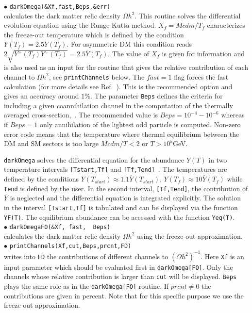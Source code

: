 \documentclass[12pt,a4paper]{article}
\begin{document}
\noindent 
$\bullet$ \verb|darkOmega(&Xf,fast,Beps,&err)|\\
calculates the dark matter relic density $\Omega h^2$. 
This routine  solves the differential evolution equation  using the Runge-Kutta method. 
$X_f=Mcdm/T_{f}$
characterizes the freeze-out temperature  which is defined by the
condition $Y(T_f)=2.5 \overline{Y}(T_f)$. For  asymmetric  DM this condition
reads $2\sqrt{Y^+(T_f)Y^-(T_f)}=2.5\overline{Y}(T_f)$.  The value of $X_f$ is given for
information and is also used as an input for the routine that
gives the relative contribution of each channel to $\Omega h^2$,
see \verb|printChannels|  below. The  $fast=1$ flag forces the
fast calculation (for more details see
Ref.~\cite{Belanger:2004yn}). This is the recommended option and
gives an accuracy around $1\%$. The parameter {\tt Beps} defines the
criteria for including a given coannihilation channel in the computation of the
thermally averaged cross-section,~\cite{Belanger:2004yn}.   The
recommended value is $Beps=10^{-4} - 10^{-6}$ whereas 
if $Beps=1$ only annihilation of the
lightest odd particle is computed. Non-zero error code means that the temperature where thermal equilibrium between the DM and SM sectors is too large  $Mcdm/T < 2$  or
$T>10^{5}$GeV. 

   
\verb|darkOmega| solves the differential equation for the abundance $Y(T)$   in  two  
temperature intervals {\tt [Tstart,Tf]}  and   {\tt [Tf,Tend]}~\cite{Belanger:2001fz}. The temperatures  are defined by the
conditions $Y(T_{start})\approx 1.1\overline{Y}(T_{start})$,
$Y(T_{f})\approx10\overline{Y}(T_{f})$ while  {\tt Tend} is defined by the
user. In the second interval,  {\tt [Tf,Tend]},  the contribution of  $\overline{Y}$
 is neglected and  the differential equation is integrated
explicitly. The solution in the interval {\tt [Tstart,Tf]}  is tabulated and can be displayed  via the
function {\tt YF(T)}. The equilibrium abundance can be accessed  with the function
{\tt Yeq(T)}. \\



\noindent
$\bullet$ \verb|darkOmegaFO(&Xf, fast,  Beps)|\\
calculates the  dark matter relic density $\Omega h^2$ using the freeze-out approximation.\\

\noindent
$\bullet$ \verb|printChannels(Xf,cut,Beps,prcnt,FD)|\\   
writes into \verb|FD| the  contributions  of different channels to $(\Omega
h^2)^{-1}$. Here \verb|Xf| is an input parameter which should
be  evaluated first in \verb|darkOmega[FO]|. Only  the channels whose
relative contribution is larger than  \verb|cut| will be displayed. \verb|Beps|
plays the same role as in the \verb|darkOmega[FO]| routine.
If $prcnt\ne 0$ the contributions are given in percent.
Note that  for this specific purpose  we use the
freeze-out approximation.\\
\end{document}
